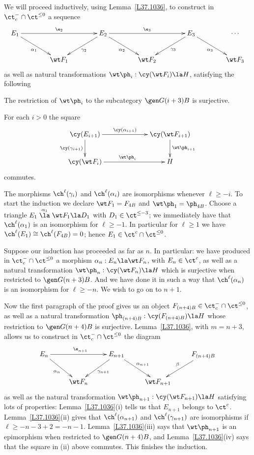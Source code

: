 \documentclass[11pt]{amsart}
\begin{document}
We will proceed inductively, using Lemma~\ref{L37.1036}, to construct
in $\ct^-_c\cap\ct^{\leq0}$ a sequence
\[\xymatrix@C+15pt{
E_1\ar[rr]^{\e_2}\ar[dr]_{\alpha_1}&  &\ar[dl]^{\gamma_2} E_2\ar[dr]_{\alpha_2}\ar[rr]^{\e_3} & & E_3\ar[dl]^-{\gamma_3}\ar[dr]_{\alpha_3} & \cdots \\
& \wt F_1 &                 & \wt F_2 & & \wt F_3
}\]
as well as natural transformations $\wt\ph_i:\cy(\wt F_i)\la H$,
satisfying the following
\be
\item
  The restriction of $\wt\ph_i$ to the subcategory $\gen G{(i+3)B}$
  is surjective.
\item
  For each $i>0$ the square
\[\xymatrix@C+40pt{
\cy(E_{i+1}) \ar[r]^-{\cy(\alpha_{i+1})}\ar[d]_-{\cy(\gamma_{i+1})} & \cy(\wt F_{i+1}) \ar[d]^{\wt\ph_{i+1}}\\
\cy(\wt F_i) \ar[r]^{\wt\ph_i} & H
}\]
commutes.
\item
  The morphisms $\ch^\ell(\gamma_i)$ and $\ch^\ell(\alpha_{i})$ are isomorphisms
  whenever $\ell\geq-i$.
\setcounter{enumiv}{\value{enumi}}
\ee
To start the induction we
declare $\wt F_1=F_{4B}$ and $\wt\ph_1=\ph_{4B}$. Choose a triangle
$E_1\stackrel{\alpha_1}\la\wt F_1\la D_1$
with $D_1\in\ct^{\leq-3}$; we immediately have that $\ch^\ell(\alpha_1)$
is an isomorphism for $\ell\geq-1$. In particular for $\ell\geq1$ we have
$\ch^\ell(E_1)\cong\ch^\ell(F_{4B})=0$; hence $E_1\in\ct^c\cap\ct^{\leq0}$.

Suppose our induction has proceeded as far as $n$.
In particular: we have produced in $\ct^-_c\cap\ct^{\leq0}$ a
morphism $\alpha_n:E_n\la \wt F_n$, with $E_n\in\ct^c$, as well
as a natural transformation $\wt\ph_n:\cy(\wt F_n)\la H$
which is surjective when restricted to $\gen G{(n+3)B}$.
And we have done it in such a way that $\ch^\ell(\alpha_n)$ is
an isomorphism for $\ell\geq-n$. We wish to go on to $n+1$.

Now the first paragraph of the proof gives us an object
$F_{(n+4)B}\in\ct^-_c\cap\ct^{\leq0}$, as well as a natural transformation
$\ph_{(n+4)B}^{}:\cy(F_{(n+4)B})\la H$ whose
restriction to $\gen G{(n+4)B}$ is surjective. Lemma~\ref{L37.1036},
with $m=n+3$,
allows us to construct in $\ct^-_c\cap\ct^{\leq0}$ the diagram
\[\xymatrix{
E_n\ar[rr]^{\e_{n+1}^{}}\ar[dr]_{\alpha_{n}}&  &\ar[dl]^{\gamma_{n+1}} E_{n+1}\ar[dr]^{\alpha_{n+1}} & & F_{(n+4)B}\ar[dl]_-{\beta} \\
& \wt F_n &                 & \wt F_{n+1}
}\]
as well as the natural transformation
$\wt\ph_{n+1}:\cy(\wt F_{n+1})\la H$
satisfying lots of properties:
Lemma~\ref{L37.1036}(i) tells us that $E_{n+1}$ belongs to $\ct^c$.
Lemma~\ref{L37.1036}(ii) gives that $\ch^\ell(\alpha_{n+1})$
and $\ch^\ell(\gamma_{n+1})$ are isomorphisms if $\ell\geq-n-3+2=-n-1$.
Lemma~\ref{L37.1036}(iii) says that $\wt\ph_{n+1}$ is an
epimorphism when restricted to $\gen G{(n+4)B}$,
and Lemma~\ref{L37.1036}(iv) says that the square in (ii) above
commutes. This finishes the induction.
\end{document}
